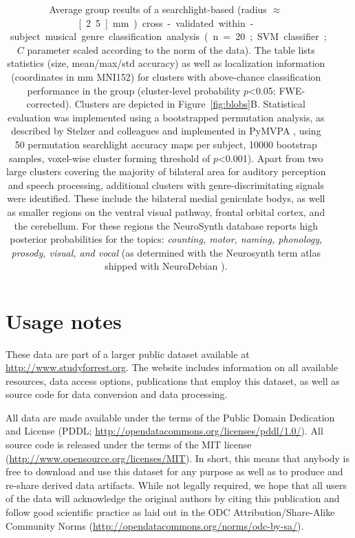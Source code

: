 \documentclass[10pt,a4paper,twocolumn]{article}
\begin{document}
\begin{table}[t]
{\begin{tabular}{rrrrrrrrrrrrp{3cm}}
\bottomrule
\end{tabular}
}%

  \caption{
    Average group results of a searchlight-based (radius
    $\approx$\unit[2.5]{mm}) cross-validated within-subject musical genre
    classification analysis (n=20; SVM classifier; $C$ parameter scaled
    according to the norm of the data). The table lists statistics (size,
    mean/max/std accuracy) as well as localization information (coordinates in
    mm MNI152) for clusters with above-chance classification performance in the
    group (cluster-level probability $p$<0.05; FWE-corrected). Clusters are
    depicted in Figure~\ref{fig:blobs}B. Statistical
    evaluation was implemented using a bootstrapped permutation analysis, as
    described by Stelzer and colleagues \cite{SCT2013} and implemented in
    PyMVPA \cite{HHS09b}, using 50 permutation searchlight accuracy maps per
    subject, 10000 bootstrap samples, voxel-wise cluster forming threshold of
    $p$<0.001).
  Apart from two large clusters covering the majority of bilateral area for
  auditory perception and speech processing, additional clusters with
  genre-discrimitating signals were identified. These include the bilateral
  medial geniculate bodys, as well as smaller regions on the ventral visual
  pathway, frontal orbital cortex, and the cerebellum. For these regions the
  NeuroSynth database \cite{YPN+2011} reports high posterior probabilities for
  the topics: \textit{counting, motor, naming, phonology, prosody, visual, and
  vocal} (as determined with the Neurosynth term atlas shipped with NeuroDebian
  \cite{HH12}).  }

  \label{tab:grpsl}
\end{table}



\section*{Usage notes}

These data are part of a larger public dataset available at
\url{http://www.studyforrest.org}. The website includes information on all
available resources, data access options, publications that employ this
dataset, as well as source code for data conversion and data processing.

All data are made available under the terms of the Public Domain Dedication and
License (PDDL; \url{http://opendatacommons.org/licenses/pddl/1.0/}). All source
code is released under the terms of the MIT license
(\url{http://www.opensource.org/licenses/MIT}). In short, this means that
anybody is free to download and use this dataset for any purpose as well as to
produce and re-share derived data artifacts. While not legally required, we
hope that all users of the data will acknowledge the original authors by citing
this publication and follow good scientific practice as laid out in the ODC
Attribution/Share-Alike Community Norms
(\url{http://opendatacommons.org/norms/odc-by-sa/}).
\end{document}
